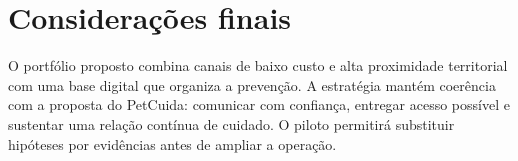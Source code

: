 \section*{Considerações finais}
O portfólio proposto combina canais de baixo custo e alta proximidade territorial com uma base digital que organiza a prevenção. A estratégia mantém coerência com a proposta do PetCuida: comunicar com confiança, entregar acesso possível e sustentar uma relação contínua de cuidado. O piloto permitirá substituir hipóteses por evidências antes de ampliar a operação.
